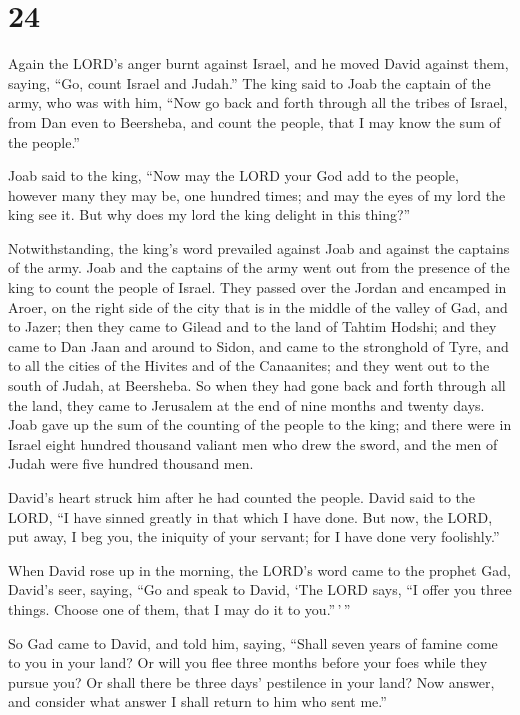 \hypertarget{section-23}{%
\section{24}\label{section-23}}

 Again the LORD's anger burnt against Israel, and he moved
David against them, saying, ``Go, count Israel and Judah.''
 The king said to Joab the captain of the army, who was
with him, ``Now go back and forth through all the tribes of Israel, from
Dan even to Beersheba, and count the people, that I may know the sum of
the people.''

 Joab said to the king, ``Now may the LORD your God add to
the people, however many they may be, one hundred times; and may the
eyes of my lord the king see it. But why does my lord the king delight
in this thing?''

 Notwithstanding, the king's word prevailed against Joab
and against the captains of the army. Joab and the captains of the army
went out from the presence of the king to count the people of Israel.
 They passed over the Jordan and encamped in Aroer, on the
right side of the city that is in the middle of the valley of Gad, and
to Jazer;  then they came to Gilead and to the land of
Tahtim Hodshi; and they came to Dan Jaan and around to Sidon,
 and came to the stronghold of Tyre, and to all the cities
of the Hivites and of the Canaanites; and they went out to the south of
Judah, at Beersheba.  So when they had gone back and forth
through all the land, they came to Jerusalem at the end of nine months
and twenty days.  Joab gave up the sum of the counting of
the people to the king; and there were in Israel eight hundred thousand
valiant men who drew the sword, and the men of Judah were five hundred
thousand men.

 David's heart struck him after he had counted the
people. David said to the LORD, ``I have sinned greatly in that which I
have done. But now, the LORD, put away, I beg you, the iniquity of your
servant; for I have done very foolishly.''

 When David rose up in the morning, the LORD's word came
to the prophet Gad, David's seer, saying,  ``Go and speak
to David, `The LORD says, ``I offer you three things. Choose one of
them, that I may do it to you.''\,'\,''

 So Gad came to David, and told him, saying, ``Shall
seven years of famine come to you in your land? Or will you flee three
months before your foes while they pursue you? Or shall there be three
days' pestilence in your land? Now answer, and consider what answer I
shall return to him who sent me.''

